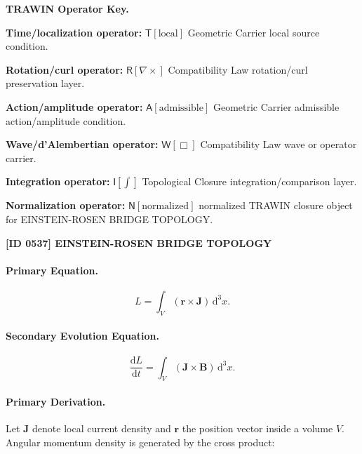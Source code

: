 \par\vspace{0.45\baselineskip}
\noindent\begin{minipage}[t]{\linewidth}
\begingroup
\small
\raggedright
\textbf{TRAWIN Operator Key.}\par
\noindent\textbf{Time/localization operator:} $\mathsf{T}\!\left[\mathrm{local}\right]$ Geometric Carrier local source condition.\par
\noindent\textbf{Rotation/curl operator:} $\mathsf{R}\!\left[\nabla\times\right]$ Compatibility Law rotation/curl preservation layer.\par
\noindent\textbf{Action/amplitude operator:} $\mathsf{A}\!\left[\mathrm{admissible}\right]$ Geometric Carrier admissible action/amplitude condition.\par
\noindent\textbf{Wave/d'Alembertian operator:} $\mathsf{W}\!\left[\Box\right]$ Compatibility Law wave or operator carrier.\par
\noindent\textbf{Integration operator:} $\mathsf{I}\!\left[\int\right]$ Topological Closure integration/comparison layer.\par
\noindent\textbf{Normalization operator:} $\mathsf{N}\!\left[\mathrm{normalized}\right]$ normalized TRAWIN closure object for EINSTEIN-ROSEN BRIDGE TOPOLOGY.\par
\endgroup
\end{minipage}

\clearpage
\noindent\textbf{[ID 0537] EINSTEIN-ROSEN BRIDGE TOPOLOGY}\par
\vspace{0.35em}
\paragraph{Primary Equation.}
\begin{equation}
L
=
\int_V
(\mathbf{r}\times\mathbf{J})
\,\mathrm{d}^3x .
\end{equation}

\paragraph{Secondary Evolution Equation.}
\begin{equation}
\frac{\mathrm{d}L}{\mathrm{d}t}
=
\int_V
(\mathbf{J}\times\mathbf{B})
\,\mathrm{d}^3x .
\end{equation}

\paragraph{Primary Derivation.}
Let $\mathbf{J}$ denote local current density and $\mathbf{r}$ the position vector inside a volume $V$.  
Angular momentum density is generated by the cross product:

